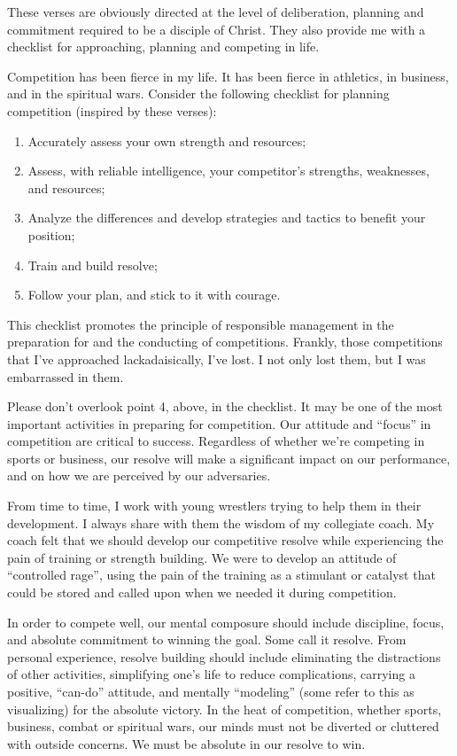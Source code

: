 \documentclass[12pt]{memoir}
\begin{document}
These verses are obviously directed at the level of deliberation,
planning and commitment required to be a disciple of Christ. They
also provide me with a checklist for approaching, planning and competing
in life.

Competition has been fierce in my life. It has been fierce in athletics,
in business, and in the spiritual wars. Consider the following checklist
for planning competition (inspired by these verses):
\begin{enumerate}
\item Accurately assess your own strength and resources; 
\item Assess, with reliable intelligence, your competitor's strengths, weaknesses,
and resources; 
\item Analyze the differences and develop strategies and tactics to benefit
your position; 
\item Train and build resolve; 
\item Follow your plan, and stick to it with courage. 
\end{enumerate}
This checklist promotes the principle of responsible management in
the preparation for and the conducting of competitions. Frankly, those
competitions that I've approached lackadaisically, I've lost. I not
only lost them, but I was embarrassed in them. 

Please don't overlook point 4, above, in the checklist. It may be
one of the most important activities in preparing for competition.
Our attitude and ``focus'' in competition are critical to success.
Regardless of whether we're competing in sports or business, our resolve
will make a significant impact on our performance, and on how we are
perceived by our adversaries. 

From time to time, I work with young wrestlers trying to help them
in their development. I always share with them the wisdom of my collegiate
coach. My coach felt that we should develop our competitive resolve
while experiencing the pain of training or strength building. We were
to develop an attitude of ``controlled rage'', using the pain of
the training as a stimulant or catalyst that could be stored and called
upon when we needed it during competition. 

In order to compete well, our mental composure should include discipline,
focus, and absolute commitment to winning the goal. Some call it resolve.
From personal experience, resolve building should include eliminating
the distractions of other activities, simplifying one's life to reduce
complications, carrying a positive, ``can-do'' attitude, and mentally
``modeling'' (some refer to this as visualizing) for the absolute
victory. In the heat of competition, whether sports, business, combat
or spiritual wars, our minds must not be diverted or cluttered with
outside concerns. We must be absolute in our resolve to win.
\end{document}
